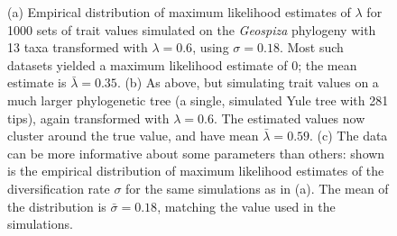 \begin{figure}
\begin{center}
\end{center}
\caption{(a) Empirical distribution of maximum likelihood estimates of $\lambda$ 
for 1000 sets of trait values simulated on the {\em Geospiza} phylogeny with 13 taxa
transformed with $\lambda=0.6$, using $\sigma=0.18$.
Most such datasets yielded a maximum likelihood estimate of 0;
the mean estimate is $\bar \lambda = 0.35$.  
(b)  As above, but simulating trait values on a much larger phylogenetic tree 
(a single, simulated Yule tree with 281 tips), again transformed with $\lambda=0.6$.
The estimated values now cluster around the true value, 
and have mean $\bar \lambda = 0.59$.  
(c) The data can be more informative about some parameters than others: 
shown is the empirical distribution of maximum likelihood estimates of the diversification rate $\sigma$ for the same simulations as in (a).
The mean of the distribution is $\bar \sigma = 0.18$, matching the value used in the simulations.  
}
\label{fig:lambda}
\end{figure}

